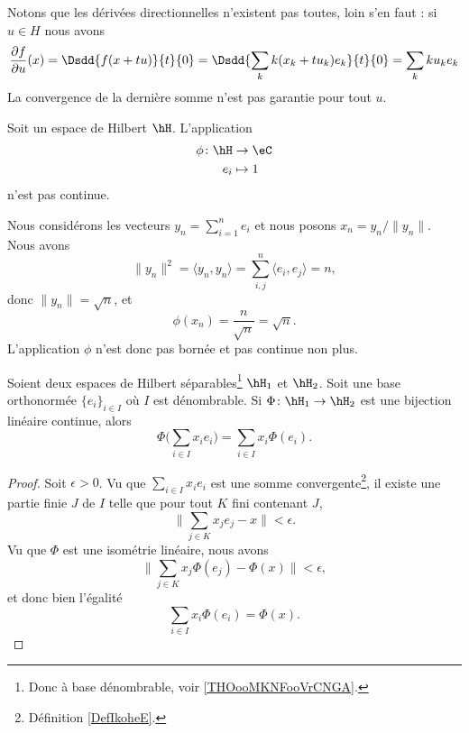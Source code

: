 Notons que les dérivées directionnelles n'existent pas toutes, loin s'en faut : si \( u\in H\) nous avons
\begin{equation}        \label{EQooWNLOooJNRUMQ}
	\frac{ \partial f }{ \partial u }(x)=\Dsdd{ f(x+tu) }{t}{0}=\Dsdd{ \sum_k k(x_k+tu_k)e_k }{t}{0}=\sum_k ku_ke_k
\end{equation}
La convergence de la dernière somme n'est pas garantie pour tout \( u\).

\begin{example}
	Soit un espace de Hilbert \( \hH\). L'application
	\begin{equation}
		\begin{aligned}
			\phi\colon \hH & \to \eC   \\
			e_i            & \mapsto 1
		\end{aligned}
	\end{equation}
	n'est pas continue.

	Nous considérons les vecteurs \( y_n=\sum_{i=1}^ne_i\) et nous posons \( x_n=y_n/\| y_n \|\). Nous avons
	\begin{equation}
		\| y_n \|^2=\langle y_n, y_n\rangle =\sum_{i,j}^n\langle e_i, e_j\rangle =n,
	\end{equation}
	donc \( \| y_n \|=\sqrt{ n }\), et
	\begin{equation}
		\phi(x_n)=\frac{ n }{ \sqrt{ n } }=\sqrt{ n }.
	\end{equation}
	L'application \( \phi\) n'est donc pas bornée et pas continue non plus.
\end{example}

\begin{proposition}     \label{PROPooWHZKooEXEIrV}
	Soient deux espaces de Hilbert séparables\footnote{Donc à base dénombrable, voir \ref{THOooMKNFooVrCNGA}.} \( \hH_1\) et \( \hH_2\). Soit une base orthonormée \( \{ e_i \}_{i\in I}\) où \( I\) est dénombrable. Si \( \Phi\colon \hH_1\to \hH_2\) est une bijection linéaire continue, alors
	\begin{equation}
		\Phi\big( \sum_{i\in I}x_ie_i \big)=\sum_{i\in I}x_i\Phi(e_i).
	\end{equation}
\end{proposition}

\begin{proof}
	Soit \( \epsilon>0\). Vu que \( \sum_{i\in I}x_ie_i\) est une somme convergente\footnote{Définition \ref{DefIkoheE}.}, il existe une partie finie \( J\) de \( I\) telle que pour tout \( K\) fini contenant \( J\),
	\begin{equation}
		\| \sum_{j\in K}x_je_j-x \|<\epsilon.
	\end{equation}
	Vu que \( \Phi\) est une isométrie linéaire, nous avons
	\begin{equation}
		\| \sum_{j\in K}x_j\Phi(e_j)-\Phi(x) \|<\epsilon,
	\end{equation}
	et donc bien l'égalité
	\begin{equation}
		\sum_{i\in I}x_i\Phi(e_i)=\Phi(x).
	\end{equation}
\end{proof}

